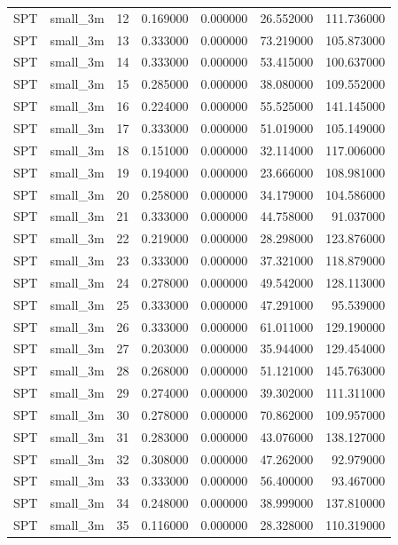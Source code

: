 \begin{tabular}{llrrrrr}
SPT & small_3m & 12 & 0.169000 & 0.000000 & 26.552000 & 111.736000 \\
SPT & small_3m & 13 & 0.333000 & 0.000000 & 73.219000 & 105.873000 \\
SPT & small_3m & 14 & 0.333000 & 0.000000 & 53.415000 & 100.637000 \\
SPT & small_3m & 15 & 0.285000 & 0.000000 & 38.080000 & 109.552000 \\
SPT & small_3m & 16 & 0.224000 & 0.000000 & 55.525000 & 141.145000 \\
SPT & small_3m & 17 & 0.333000 & 0.000000 & 51.019000 & 105.149000 \\
SPT & small_3m & 18 & 0.151000 & 0.000000 & 32.114000 & 117.006000 \\
SPT & small_3m & 19 & 0.194000 & 0.000000 & 23.666000 & 108.981000 \\
SPT & small_3m & 20 & 0.258000 & 0.000000 & 34.179000 & 104.586000 \\
SPT & small_3m & 21 & 0.333000 & 0.000000 & 44.758000 & 91.037000 \\
SPT & small_3m & 22 & 0.219000 & 0.000000 & 28.298000 & 123.876000 \\
SPT & small_3m & 23 & 0.333000 & 0.000000 & 37.321000 & 118.879000 \\
SPT & small_3m & 24 & 0.278000 & 0.000000 & 49.542000 & 128.113000 \\
SPT & small_3m & 25 & 0.333000 & 0.000000 & 47.291000 & 95.539000 \\
SPT & small_3m & 26 & 0.333000 & 0.000000 & 61.011000 & 129.190000 \\
SPT & small_3m & 27 & 0.203000 & 0.000000 & 35.944000 & 129.454000 \\
SPT & small_3m & 28 & 0.268000 & 0.000000 & 51.121000 & 145.763000 \\
SPT & small_3m & 29 & 0.274000 & 0.000000 & 39.302000 & 111.311000 \\
SPT & small_3m & 30 & 0.278000 & 0.000000 & 70.862000 & 109.957000 \\
SPT & small_3m & 31 & 0.283000 & 0.000000 & 43.076000 & 138.127000 \\
SPT & small_3m & 32 & 0.308000 & 0.000000 & 47.262000 & 92.979000 \\
SPT & small_3m & 33 & 0.333000 & 0.000000 & 56.400000 & 93.467000 \\
SPT & small_3m & 34 & 0.248000 & 0.000000 & 38.999000 & 137.810000 \\
SPT & small_3m & 35 & 0.116000 & 0.000000 & 28.328000 & 110.319000 \\

\end{tabular}

